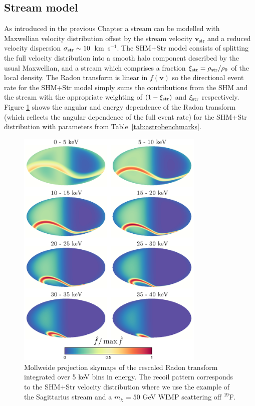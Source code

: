 \subsection{Stream model}\label{sec:directional_streammodels}
As introduced in the previous Chapter a stream can be modelled with Maxwellian velocity distribution offset by the stream velocity $\textbf{v}_\textrm{str}$ and a reduced velocity dispersion $\sigma_{\rm str}\sim 10$~km~s$^{-1}$. The SHM+Str model consists of splitting the full velocity distribution into a smooth halo component described by the usual Maxwellian, and a stream which comprises a fraction $\xi_{\rm str} = \rho_{\rm str}/\rho_0$ of the local density. The Radon transform is linear in $f(\textbf{v})$ so the directional event rate for the SHM+Str model simply sums the contributions from the SHM and the stream with the appropriate weighting of $(1-\xi_{\rm str})$ and $\xi_{\rm str}$ respectively. Figure \ref{fig:streamskymap} shows the angular and energy dependence of the Radon transform (which reflects the angular dependence of the full event rate) for the SHM+Str distribution with parameters from Table~\ref{tab:astrobenchmarks}.
\begin{figure}
	\centering
	\includegraphics[trim = 0mm 0 0mm 0mm, clip, width=0.8\textwidth]{Figures/streamskymap.eps}
	\caption[Directional recoil skymaps for the SHM+Stream model]{Mollweide projection skymaps of the rescaled Radon transform integrated over 5 keV bins in energy. The recoil pattern corresponds to the SHM+Str velocity distribution where we use the example of the Sagittarius stream and a $m_\chi = 50$ GeV WIMP scattering off $^{19}$F.}
	\label{fig:streamskymap}
\end{figure}

